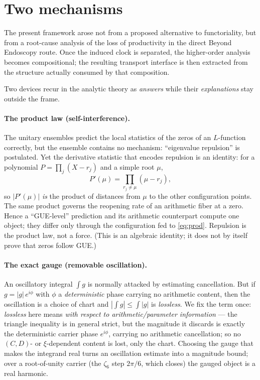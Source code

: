 \documentclass[11pt]{article}
\theoremstyle{definition}
\begin{document}
\section{Two mechanisms}\label{sec:two}

The present framework arose not from a proposed alternative to functoriality, but from a root-cause
analysis of the loss of productivity in the direct Beyond Endoscopy route. Once the induced clock is
separated, the higher-order analysis becomes compositional; the resulting transport interface is then
extracted from the structure actually consumed by that composition.

Two devices recur in the analytic theory as \emph{answers} while their \emph{explanations} stay
outside the frame.

\paragraph{The product law (self-interference).} The unitary ensembles predict the local statistics
of the zeros of an $L$-function correctly, but the ensemble contains no mechanism: ``eigenvalue repulsion'' is
postulated. Yet the derivative statistic that encodes repulsion is an identity: for a polynomial
$P=\prod_j(X-r_j)$ and a simple root $\mu$,
\begin{equation}\label{eq:prod}
  P'(\mu)=\prod_{r_j\neq\mu}(\mu-r_j),
\end{equation}
so $|P'(\mu)|$ \emph{is} the product of distances from $\mu$ to the other configuration points. The
same product governs the reopening rate of an arithmetic fiber at a zero. Hence a ``GUE-level''
prediction and its arithmetic counterpart compute one object; they differ only through the
configuration fed to \eqref{eq:prod}. Repulsion is the product law, not a force. (This is an
algebraic identity; it does not by itself prove that zeros follow GUE.)

\paragraph{The exact gauge (removable oscillation).} An oscillatory integral $\int g$ is normally
attacked by estimating cancellation. But if $g=|g|\,e^{i\phi}$ with $\phi$ a \emph{deterministic}
phase carrying no arithmetic content, then the oscillation is a choice of chart and
$|\int g|\le\int|g|$ is \emph{lossless}. We fix the term once: \emph{lossless} here means \emph{with
respect to arithmetic/parameter information} --- the triangle inequality is in general strict, but the
magnitude it discards is exactly the deterministic carrier phase $e^{i\phi}$, carrying no arithmetic
cancellation; so no $(C,D)$- or $\xi$-dependent content is lost, only the chart. Choosing the gauge that
makes the integrand real turns an oscillation estimate into a magnitude bound; over a root-of-unity
carrier (the $\zeta_6$ step $2\pi/6$, which closes) the gauged object is a real harmonic.
\end{document}
